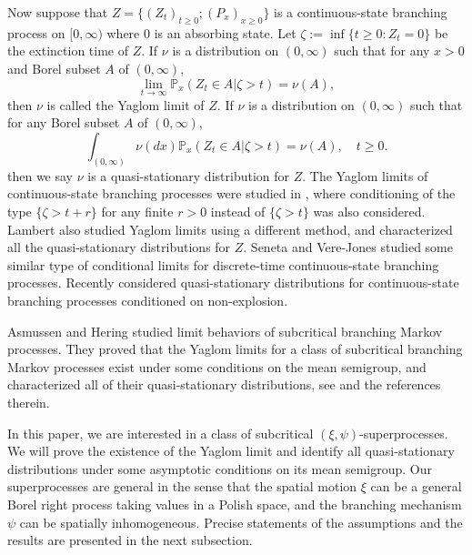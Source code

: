 \documentclass[12pt,a4paper]{amsart}
\numberwithin{equation}{section}
\theoremstyle{plain}
\theoremstyle{definition}
\theoremstyle{remark}
\begin{document}
	Now suppose that $Z =\{(Z_t)_{t \geq 0}; (P_x)_{x\geq 0}\}$  is a  continuous-state branching process on $[0,\infty)$ where $0$ is an absorbing state.  Let $\zeta:=\inf\{t\geq 0: Z_t=0\}$ be the extinction time of $Z$.
	If $\nu$ is a distribution on $(0,\infty)$ such that for any $x>0$ and Borel subset $A$ of $(0,\infty)$,
\[
	\lim_{t\rightarrow\infty}\mathbb P_x(Z_t\in A\big|\zeta>t)=\nu(A),
\]
	then $\nu$ is called the Yaglom limit of $Z$.
	If $\nu$ is a distribution on $(0,\infty)$ such that for any Borel subset $A$ of $(0,\infty)$,
\[
	\int_{(0,\infty)} \nu(dx)\mathbb P_x (Z_t \in A | \zeta > t) = \nu (A), \quad t\geq 0.
\]
	then we say $\nu$ is a quasi-stationary distribution for $Z$.
	The Yaglom limits of continuous-state branching processes were studied in \cite{Li00}, where conditioning of the type $\{\zeta>t+r\}$ for any finite $r>0$ instead of $\{\zeta>t\}$ was also considered.
	Lambert \cite{Lambert2007Quasi-stationary} also studied Yaglom limits using a different method, and characterized all the quasi-stationary distributions  for $Z$.
	Seneta and Vere-Jones \cite{SenetaVere-Jones1968On} studied some similar type of conditional limits for discrete-time continuous-state branching processes.
	Recently \cite{Labbe2013Quasi-stationary} considered quasi-stationary distributions for continuous-state branching processes conditioned on non-explosion.


Asmussen and Hering \cite{AH} studied limit behaviors of subcritical branching Markov processes. 
They proved that the Yaglom limits for a class of subcritical  branching Markov processes exist under some conditions on the mean semigroup, and characterized all of their quasi-stationary distributions,
see \cite[Chapter 5]{AH} and the references therein.


In this paper, we are interested in a class of
subcritical $(\xi, \psi)$-superprocesses.
	We will prove the existence of the Yaglom limit and identify all  quasi-stationary distributions
under some asymptotic conditions on its mean semigroup.
	Our superprocesses are general in the sense that the spatial motion $\xi$ can be a general
Borel right process taking values in a Polish space,
	and the branching mechanism $\psi$ can be spatially inhomogeneous.
	Precise statements of the assumptions and the results are presented in the next subsection.
	
\end{document}
